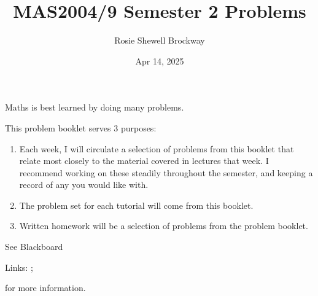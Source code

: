 \documentclass[letterpaper,10pt,english]{jupyterBook}
\title{MAS2004/9 Semester 2 Problems}
\date{Apr 14, 2025}
\author{Rosie Shewell Brockway}
\begin{document}
\pagestyle{empty}
\sphinxmaketitle
\pagestyle{plain}
\sphinxtableofcontents
\pagestyle{normal}
\label{\detokenize{intro::doc}}


\sphinxAtStartPar
Maths is best learned by doing many problems.

\sphinxAtStartPar
This problem booklet serves 3 purposes:

\label{\detokenize{intro:pow}}\begin{enumerate}
%
\item {} 
\sphinxAtStartPar
{} 
Each week, I will circulate a selection of problems from this booklet that relate most closely to the material covered in lectures that week. I recommend working on these steadily throughout the semester, and keeping a record of any you would like  with.

\item {} 
\sphinxAtStartPar
{} 
The problem set for each tutorial will come from this booklet.

\item {} 
\sphinxAtStartPar
{} 
Written homework will be a selection of problems from the problem booklet. 

\end{enumerate}

\sphinxAtStartPar
See Blackboard%
\begin{footnote}[1]\sphinxAtStartFootnote
Links: ; 
%
\end{footnote} for more information.



\begin{DUlineblock}{0em}
\item[] 
\end{DUlineblock}

\sphinxAtStartPar
{\hyperref[\detokenize{Problems:prob}]{}} 
  {\hyperref[\detokenize{Problems:ch1prob}]{}} 
  {\hyperref[\detokenize{Problems:ch2prob}]{}} 
  {\hyperref[\detokenize{Problems:ch3prob}]{}} 
  {\hyperref[\detokenize{Problems:ch4prob}]{}} 
  {\hyperref[\detokenize{Problems:ch5prob}]{}} 
  {\hyperref[\detokenize{Problems:ch6prob}]{}}
\end{document}
